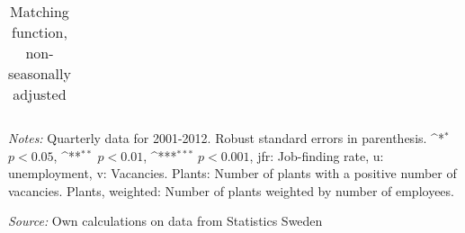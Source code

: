 \begin{table}[htbp]\centering
\def\sym#1{\ifmmode^{#1}\else\(^{#1}\)\fi}
\caption{Matching function, non-seasonally adjusted \label{tab:matchning_nsa}}
\begin{tabular*}{1\hsize}{@{\hskip\tabcolsep\extracolsep\fill}l*{3}{c}}
\toprule


\bottomrule

\end{tabular*}
   \begin{tablenotes}[flushleft]
      \small
\item \emph{Notes:} Quarterly data for 2001-2012. Robust standard errors in parenthesis. \sym{*} \(p<0.05\), \sym{**} \(p<0.01\), \sym{***} \(p<0.001\), jfr: Job-finding rate, u: unemployment, v: Vacancies. Plants: Number of plants with a positive number of vacancies. Plants, weighted: Number of plants weighted by number of employees. \\
\item  \emph{Source:} Own calculations on data from Statistics Sweden
    \end{tablenotes}
\end{table}

